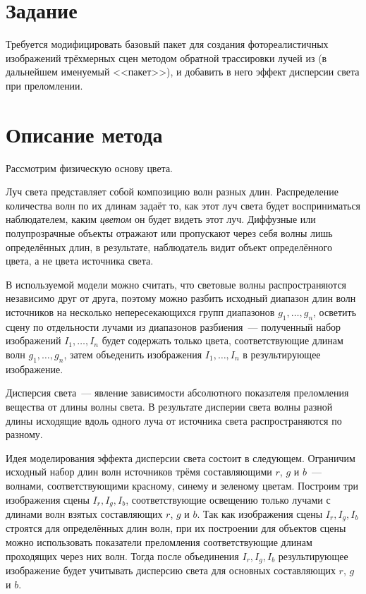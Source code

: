 \documentclass[a4paper,10pt]{article}
\begin{document}



\section{Задание}
Требуется модифицировать базовый пакет для создания фотореалистичных изображений трёхмерных сцен 
методом обратной трассировки лучей из \cite{shikin1995cg} (в дальнейшем именуемый <<пакет>>),
и добавить в него эффект дисперсии света при преломлении.

\section{Описание метода}
Рассмотрим физическую основу цвета.

Луч света представляет собой композицию волн разных длин.
Распределение количества волн по их длинам задаёт то, 
как этот луч света будет восприниматься наблюдателем, 
каким \textit{цветом} он будет видеть этот луч.
Диффузные или полупрозрачные объекты отражают или пропускают через себя волны лишь определённых длин,
в результате, наблюдатель видит объект определённого цвета, а не цвета источника света.

В используемой модели можно считать, 
что световые волны распространяются независимо друг от друга, 
поэтому можно разбить исходный диапазон длин волн источников 
на несколько непересекающихся групп диапазонов $g_1, \ldots, g_n$, 
осветить сцену по отдельности лучами из диапазонов разбиения~--- 
полученный набор изображений $I_1, \ldots, I_n$ будет содержать только цвета, 
соответствующие длинам волн $g_1, \ldots, g_n$, 
затем объеденить изображения $I_1, \ldots, I_n$ в результирующее изображение.

Дисперсия света~--- явление зависимости абсолютного показателя преломления вещества от длины волны света.
В результате дисперии света волны разной длины исходящие вдоль одного луча от источника света 
распространяются по разному.

Идея моделирования эффекта дисперсии света состоит в следующем.
Ограничим исходный набор длин волн источников трёмя составляющими $r$, $g$ и $b$~---
волнами, соответствующими красному, синему и зеленому цветам.
Построим три изображения сцены $I_r, I_g, I_b$, соответствующие
освещению только лучами с длинами волн взятых составляющих $r$, $g$ и $b$.
Так как изображения сцены $I_r, I_g, I_b$ строятся для определённых длин волн, 
при их построении для объектов сцены можно использовать показатели преломления соответствующие длинам
проходящих через них волн.
Тогда после объединения $I_r, I_g, I_b$ результирующее изображение будет учитывать дисперсию света для
основных составляющих $r$, $g$ и $b$.
\end{document}
